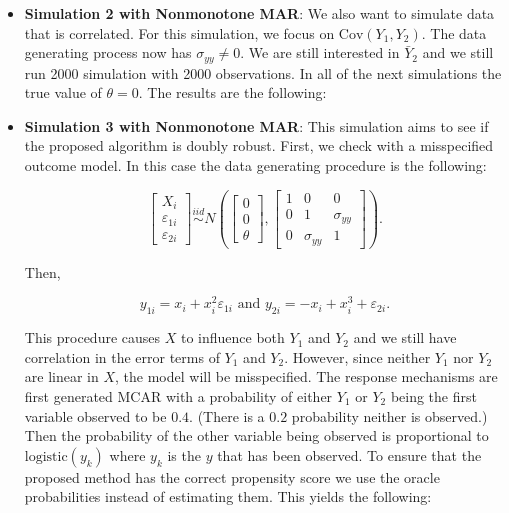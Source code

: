 \documentclass[12pt]{article}
\newcommand{\Cov}{{\text{Cov}}}
\newcommand{\logistic}{{\text{logistic}}}
\begin{document}
\begin{itemize}
    
    
    

    \newpage
    
    \item \textbf{Simulation 2 with Nonmonotone MAR}:
    We also want to simulate data that is correlated. For this simulation, we
    focus on $\Cov(Y_1, Y_2)$. The data generating process now has $\sigma_{yy}
    \neq 0$. We are still interested in $\bar Y_2$ and we still run 2000
    simulation with 2000 observations. In all of the next simulations the true
    value of $\theta = 0$. The results are the following:

    
    
    

    \newpage

  \item \textbf{Simulation 3 with Nonmonotone MAR}:
    This simulation aims to see if the proposed algorithm is doubly robust.
    First, we check with a misspecified outcome model. In this case the data
    generating procedure is the following:

    \[\begin{bmatrix}
    X_i \\ \varepsilon_{1i} \\ \varepsilon_{2i}
    \end{bmatrix} \stackrel{iid}{\sim}
    N\left(
    \begin{bmatrix}
        0 \\ 0 \\ \theta
    \end{bmatrix},
    \begin{bmatrix}
        1 & 0 & 0 \\
        0 & 1 & \sigma_{yy}\\
        0 & \sigma_{yy} & 1
    \end{bmatrix}
    \right).\]

    Then, 

    \[y_{1i} = x_i + x_i^2 \varepsilon_{1i} \text{ and } 
    y_{2i} = -x_i + x_i^3 + \varepsilon_{2i}.\]

    This procedure causes $X$ to influence both $Y_1$ and $Y_2$ and we still
    have correlation in the error terms of $Y_1$ and $Y_2$. However, since
    neither $Y_1$ nor $Y_2$ are linear in $X$, the model will be misspecified.
    The response mechanisms are first generated MCAR with a probability of
    either $Y_1$ or $Y_2$ being the first variable observed to be $0.4$. (There
    is a $0.2$ probability neither is observed.) Then the probability of the
    other variable being observed is proportional to $\logistic(y_k)$ where
    $y_k$ is the $y$ that has been observed. To ensure that the proposed method
    has the correct propensity score we use the oracle probabilities instead of
    estimating them. This yields the following:


\end{itemize}
\end{document}
